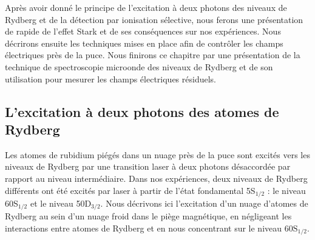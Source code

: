 Après avoir donné le principe de l'excitation à deux photons des niveaux de Rydberg et de la détection par ionisation sélective, nous ferons une présentation de rapide de l'effet Stark et de ses conséquences sur nos expériences.
Nous décrirons ensuite les techniques mises en place afin de contrôler les champs électriques près de la puce.
Nous finirons ce chapitre par une présentation de la technique de spectroscopie microonde des niveaux de Rydberg et de son utilisation pour mesurer les champs électriques résiduels.

	\subsection{L'excitation à deux photons des atomes de Rydberg}

\noindent Les atomes de rubidium piégés dans un nuage près de la puce sont excités vers les niveaux de Rydberg par une transition laser à deux photons désaccordée par rapport au niveau intermédiaire.
Dans nos expériences, deux niveaux de Rydberg différents ont été excités par laser à partir de l'état fondamental 5S$_{1/2}$ : le niveau 60S$_{1/2}$ et le niveau 50D$_{3/2}$.
Nous décrivons ici l'excitation d'un nuage d'atomes de Rydberg au sein d'un nuage froid dans le piège magnétique, en négligeant les interactions entre atomes de Rydberg et en nous concentrant sur le niveau $\mathrm{60S_{1/2}}$.

